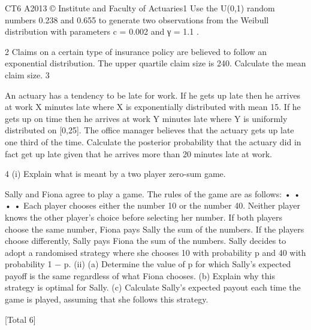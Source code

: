 CT6 A2013
© Institute and Faculty of Actuaries1 Use the U(0,1) random numbers 0.238 and 0.655 to generate two observations from
the Weibull distribution with parameters c = 0.002 and γ = 1.1 .

2 Claims on a certain type of insurance policy are believed to follow an exponential
distribution. The upper quartile claim size is 240.
Calculate the mean claim size.
3

An actuary has a tendency to be late for work. If he gets up late then he arrives at
work X minutes late where X is exponentially distributed with mean 15. If he gets up
on time then he arrives at work Y minutes late where Y is uniformly distributed on
[0,25]. The office manager believes that the actuary gets up late one third of the time.
Calculate the posterior probability that the actuary did in fact get up late given that he
arrives more than 20 minutes late at work.

4
(i)
Explain what is meant by a two player zero-sum game.

Sally and Fiona agree to play a game. The rules of the game are as follows:
•
•
•
•
Each player chooses either the number 10 or the number 40.
Neither player knows the other player’s choice before selecting her number.
If both players choose the same number, Fiona pays Sally the sum of the numbers.
If the players choose differently, Sally pays Fiona the sum of the numbers.
Sally decides to adopt a randomised strategy where she chooses 10 with probability p
and 40 with probability 1 − p.
(ii)
(a) Determine the value of p for which Sally’s expected payoff is the same
regardless of what Fiona chooses.
(b) Explain why this strategy is optimal for Sally.
(c) Calculate Sally’s expected payout each time the game is played,
assuming that she follows this strategy.

[Total 6]



